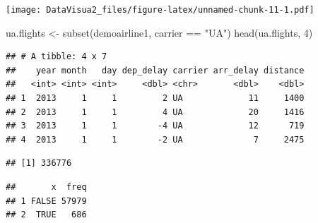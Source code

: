 \documentclass[
]{article}
\newenvironment{Shaded}{\begin{snugshade}}{\end{snugshade}}
\newcommand{\CommentTok}[1]{\textcolor[rgb]{0.56,0.35,0.01}{\textit{#1}}}
\newcommand{\DecValTok}[1]{\textcolor[rgb]{0.00,0.00,0.81}{#1}}
\newcommand{\FunctionTok}[1]{\textcolor[rgb]{0.00,0.00,0.00}{#1}}
\newcommand{\NormalTok}[1]{#1}
\newcommand{\OtherTok}[1]{\textcolor[rgb]{0.56,0.35,0.01}{#1}}
\newcommand{\SpecialCharTok}[1]{\textcolor[rgb]{0.00,0.00,0.00}{#1}}
\newcommand{\StringTok}[1]{\textcolor[rgb]{0.31,0.60,0.02}{#1}}
\begin{document}
\texttt{[image: DataVisua2\_files/figure-latex/unnamed-chunk-11-1.pdf]}

\begin{Shaded}
\begin{Highlighting}[]
\NormalTok{ua.flights }\OtherTok{\textless{}{-}} \FunctionTok{subset}\NormalTok{(demoairline1, carrier }\SpecialCharTok{==} \StringTok{"UA"}\NormalTok{)}
\FunctionTok{head}\NormalTok{(ua.flights, }\DecValTok{4}\NormalTok{)}
\end{Highlighting}
\end{Shaded}

\begin{verbatim}
## # A tibble: 4 x 7
##    year month   day dep_delay carrier arr_delay distance
##   <int> <int> <int>     <dbl> <chr>       <dbl>    <dbl>
## 1  2013     1     1         2 UA             11     1400
## 2  2013     1     1         4 UA             20     1416
## 3  2013     1     1        -4 UA             12      719
## 4  2013     1     1        -2 UA              7     2475
\end{verbatim}

\begin{Shaded}
\end{Shaded}

\begin{verbatim}
## [1] 336776
\end{verbatim}

\begin{Shaded}
\end{Shaded}

\begin{verbatim}
##       x  freq
## 1 FALSE 57979
## 2  TRUE   686
\end{verbatim}

\begin{Shaded}
\end{Shaded}
\end{document}
